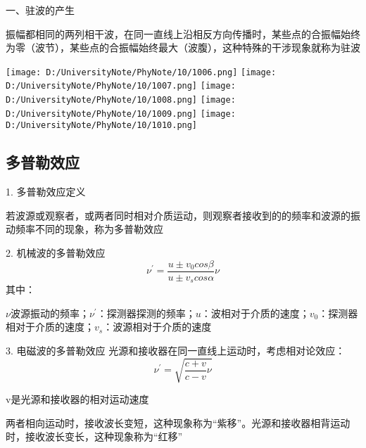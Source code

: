 \documentclass[UTF8]{article}
\begin{document}
    一、驻波的产生

    振幅都相同的两列相干波，在同一直线上沿相反方向传播时，某些点的合振幅始终为零（波节），某些点的合振幅始终最大（波腹），这种特殊的干涉现象就称为驻波

    \texttt{[image: D:/UniversityNote/PhyNote/10/1006.png]}
    \texttt{[image: D:/UniversityNote/PhyNote/10/1007.png]}
    \texttt{[image: D:/UniversityNote/PhyNote/10/1008.png]}
    \texttt{[image: D:/UniversityNote/PhyNote/10/1009.png]}
    \texttt{[image: D:/UniversityNote/PhyNote/10/1010.png]}

\subsection{多普勒效应}

    1. 多普勒效应定义
    
    若波源或观察者，或两者同时相对介质运动，则观察者接收到的的频率和波源的振动频率不同的现象，称为多普勒效应

    2. 机械波的多普勒效应
    \[\nu^{'} = \frac{u\pm v_0cos\beta}{u\pm v_s cos\alpha}\nu\]
    其中：
    
    $\nu$波源振动的频率；$\nu^{'}$：探测器探测的频率；$u$：波相对于介质的速度；$v_0$：探测器相对于介质的速度；$v_s$：波源相对于介质的速度


    3. 电磁波的多普勒效应
    光源和接收器在同一直线上运动时，考虑相对论效应：
    \[\nu^{'} = \sqrt{\frac{c + v}{c - v}\nu}\]

    v是光源和接收器的相对运动速度

    两者相向运动时，接收波长变短，这种现象称为“紫移”。光源和接收器相背运动时，接收波长变长，这种现象称为“红移”
    
\end{document}
